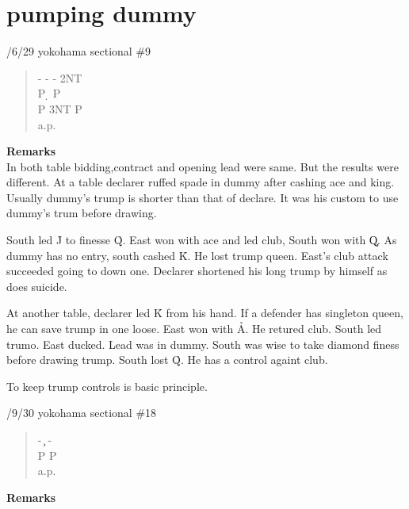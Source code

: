 \section{pumping dummy}
/6/29 yokohama sectional \#9
\begin{quote}
%
  {}%
  {}
  {}%
  {}%
\end{quote}
\begin{quote}
\begin{bidding}
- \> -  \> - \> 2NT  \\
P \d \> P  \h \\
P \> 3NT \> P \h \\
a.p.
\end{bidding}
\end{quote}
{\bf Remarks}\\

In both table bidding,contract and opening lead were same. But
the results were different. At a table declarer ruffed spade in
dummy after cashing ace and king. Usually dummy's trump is shorter
than that of declare. It was his custom to use dummy's trum before
drawing.

South led \h J to finesse \h Q. East won with ace and led club,
South won with \c Q.
As dummy has no entry, south cashed \h K. He lost trump queen.
East's club attack succeeded going to down one.
Declarer shortened his long trump by himself as does suicide.

At another table, declarer led \h K from his hand.
If a defender has singleton queen, he can save trump 
in one loose. East won with \h A. He retured club. South
led trumo. East ducked. Lead was in dummy. South was wise to
take diamond finess before drawing trump.
South lost \h Q. He has a control againt club.

To keep trump controls is basic principle.

\vspace{0.5cm}

/9/30 yokohama sectional \#18

\begin{quote}
%
  {}%
  {}
  {}%
  {}%
\end{quote}
\begin{quote}
\begin{bidding}
- \c  \> - \s  \\
P \s \> P  \s \\
a.p.
\end{bidding}
\end{quote}
{\bf Remarks}\\

